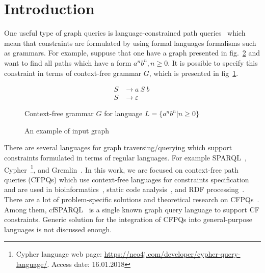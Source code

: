 \section{Introduction}

One useful type of graph queries is language-constrained path queries~\cite{FLCpathProblem} which mean that constraints are formulated by using formal languages formalisms such as grammars.
For example, suppuse that one have a graph presented in fig.~\ref{fig:exmplInputGraph} and want to find all paths which have a form $a^nb^n, n \geq 0$.
It is possible to specify this constraint in terms of context-free grammar $G$, which is presented in fig~\ref{fig:anbnGrammar}.

\begin{figure}[h]
\begin{align*}
S & \rightarrow a \ S \ b \ 
\\
S & \rightarrow \varepsilon
\end{align*}
\caption{Context-free grammar $G$ for language $L=\{a^nb^n| n \geq 0\}$}
\label{fig:anbnGrammar}
\end{figure}


\begin{figure}[h]
\caption{An example of input graph}
\label{fig:exmplInputGraph}
\end{figure}


There are several languages for graph traversing/querying which support constraints formulated in terms of regular languages.
For example SPARQL~\cite{sparql}, Cypher~\footnote{Cypher language web page: \url{https://neo4j.com/developer/cypher-query-language/}. Access date: 16.01.2018}, and Gremlin~\cite{gremlin}.
In this work, we are focused on context-free path queries (CFPQs) which use context-free languages for constraints specification and are used in bioinformatics~\cite{GraphQueryWithEarley}, static code analysis~\cite{Reps, Zheng, LabelFlowCFLReachability, specificationCFLReachability, JavaCFL}, and RDF processing~\cite{CFGonRDF}. 
There are a lot of problem-specific solutions and theoretical research on CFPQs~\cite{Yannakakis, ConjCFPathQuery, Hellings16, GrigorevR16, QueryGraphWithData, RegularDBQuery, GraphQueryWithEarley, graphDB}.
Among them, cfSPARQL~\cite{CFGonRDF} is a single known graph query language to support CF constraints. Generic solution for the integration of CFPQs into general-purpose languages is not discussed enough.

